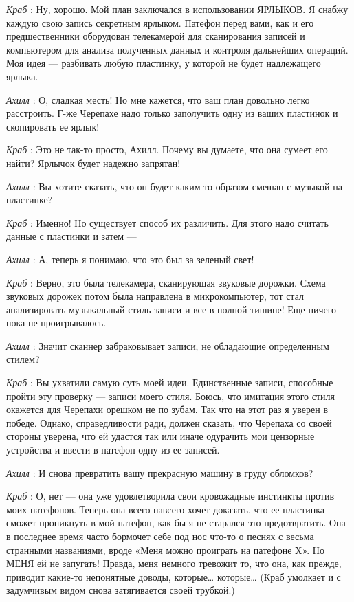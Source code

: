 \documentclass[../main.tex]{subfiles}
\begin{document}
\begin{dialogue}
\emph{Краб} : Ну, хорошо. Мой план заключался в использовании ЯРЛЫКОВ. Я снабжу каждую свою запись секретным ярлыком. Патефон перед вами, как и его предшественники оборудован телекамерой для сканирования записей и компьютером для анализа полученных данных и контроля дальнейших операций. Моя идея --- разбивать любую пластинку, у которой не будет надлежащего ярлыка.

\emph{Ахилл} : О, сладкая месть! Но мне кажется, что ваш план довольно легко расстроить. Г-же Черепахе надо только заполучить одну из ваших пластинок и скопировать ее ярлык!

\emph{Краб} : Это не так-то просто, Ахилл. Почему вы думаете, что она сумеет его найти? Ярлычок будет надежно запрятан!

\emph{Ахилл} : Вы хотите сказать, что он будет каким-то образом смешан с музыкой на пластинке?

\emph{Краб} : Именно! Но существует способ их различить. Для этого надо считать данные с пластинки и затем ---

\emph{Ахилл} : А, теперь я понимаю, что это был за зеленый свет!

\emph{Краб} : Верно, это была телекамера, сканирующая звуковые дорожки. Схема звуковых дорожек потом была направлена в микрокомпьютер, тот стал анализировать музыкальный стиль записи и все в полной тишине! Еще ничего пока не проигрывалось.

\emph{Ахилл} : Значит сканнер забраковывает записи, не обладающие определенным стилем?

\emph{Краб} : Вы ухватили самую суть моей идеи. Единственные записи, способные пройти эту проверку --- записи моего стиля. Боюсь, что имитация этого стиля окажется для Черепахи орешком не по зубам. Так что на этот раз я уверен в победе. Однако, справедливости ради, должен сказать, что Черепаха со своей стороны уверена, что ей удастся так или иначе одурачить мои цензорные устройства и ввести в патефон одну из ее записей.

\emph{Ахилл} : И снова превратить вашу прекрасную машину в груду обломков?

\emph{Краб} : О, нет --- она уже удовлетворила свои кровожадные инстинкты против моих патефонов. Теперь она всего-навсего хочет доказать, что ее пластинка сможет проникнуть в мой патефон, как бы я не старался это предотвратить. Она в последнее время часто бормочет себе под нос что-то о песнях с весьма странными названиями, вроде «Меня можно проиграть на патефоне X». Но МЕНЯ ей не запугать! Правда, меня немного тревожит то, что она, как прежде, приводит какие-то непонятные доводы, которые\ldots{} которые\ldots{} (Краб умолкает и с задумчивым видом снова затягивается своей трубкой.)


\end{dialogue}
\end{document}
